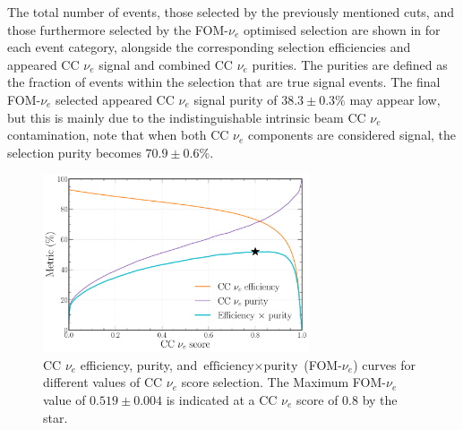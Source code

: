 The total number of events, those selected by the previously mentioned cuts, and those furthermore
selected by the FOM-$\nu_e$ optimised selection are shown in  for
each event category, alongside the corresponding selection efficiencies and appeared CC $\nu_{e}$
signal and combined CC $\nu_{e}$ purities. The purities are defined as the fraction of events
within the selection that are true signal events. The final FOM-$\nu_e$ selected appeared CC
$\nu_{e}$ signal purity of $38.3\pm0.3\%$ may appear low, but this is mainly due to the
indistinguishable intrinsic beam CC $\nu_{e}$ contamination, note that when both CC $\nu_{e}$
components are considered signal, the selection purity becomes $70.9\pm0.6\%$.

\begin{figure} %
    \includegraphics[width=0.7\textwidth]{diagrams/7-results/final_nuel_eff_curves.pdf}
    \caption[CC $\nu_{e}$ efficiency, purity, and $\text{efficiency}\times\text{purity}$ curves]
    {CC $\nu_{e}$ efficiency, purity, and $\text{efficiency}\times\text{purity}$ (FOM-$\nu_e$)
        curves for different values of CC $\nu_{e}$ score selection. The Maximum FOM-$\nu_e$ value
        of $0.519\pm0.004$ is indicated at a CC $\nu_{e}$ score of $0.8$ by the star.}
    \label{fig:final_nuel_eff_curves}
\end{figure}

